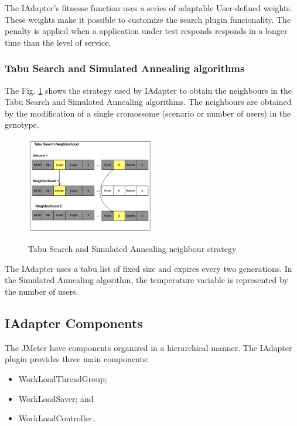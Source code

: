 The IAdapter's fitnesse function uses a series of adaptable User-defined weights. These weights make it possible to customize the search plugin funcionality. The penalty is applied when a application under test responds responds in a longer time than the level of service.

\subsubsection{Tabu Search and Simulated Annealing algorithms }

The Fig. \ref{fig:neighbourtaby} shows the strategy used by IAdapter to obtain the neighbours in the Tabu Search and Simulated Annealing algorithms.  The neighbours are obtained by the modification of a single cromossome (scenario or  number of users) in the genotype.

\begin{figure}
\caption{Tabu Search and Simulated Annealing neighbour strategy}
\includegraphics[width=0.5\textwidth]{./images/TabuNE.png}
\label{fig:neighbourtaby}
\end{figure}

The IAdapter uses a tabu list of fixed size and expires every two generations. In the Simulated Annealing algorithm, the temperature variable is represented by the number of users.


\subsection{IAdapter Components}

The JMeter have components organized  in a hierarchical manner. The IAdapter plugin provides three main components:

\begin{itemize}
\item WorkLoadThreadGroup;
\item WorkLoadSaver; and
\item WorkLoadController.
\end{itemize}
 
